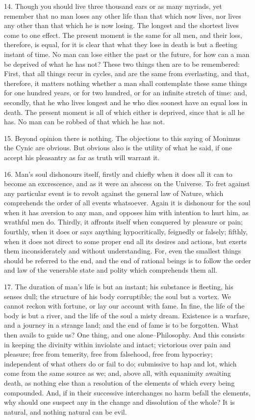 \documentclass{book}
\begin{document}
14. Though you should live three thousand ears or as many myriads, yet
remember that no man loses any other life than that which now lives,
nor lives any other than that which he is now losing. The longest and
the shortest lives come to one effect. The present moment is the same
for all men, and their loss, therefore, is equal, for it is clear that
what they lose in death is but a fleeting instant of time. No man can
lose either the past or the future, for how can a man be deprived of
what he has not? These two things then are to be remembered: First,
that all things recur in cycles, and are the same from everlasting,
and that, therefore, it matters nothing whether a man shall
contemplate these same things for one hundred years, or for two
hundred, or for an infinite stretch of time: and, secondly, that he
who lives longest and he who dies soonest have an equal loss in
death. The present moment is all of which either is deprived, since
that is all he has. No man can be robbed of that which he has not.

15. Beyond opinion there is nothing. The objections to this saying of
Monimus the Cynic are obvious. But obvious also is the utility of what
he said, if one accept his pleasantry as far as truth will warrant it.

16. Man's soul dishonours itself, firstly and chiefly when it does all
it can to become an excrescence, and as it were an abscess on the
Universe. To fret against any particular event is to revolt against
the general law of Nature, which comprehends the order of all events
whatsoever. Again it is dishonour for the soul when it has aversion to
any man, and opposes him with intention to hurt him, as wrathful men
do. Thirdly, it affronts itself when conquered by pleasure or pain;
fourthly, when it does or says anything hypocritically, feignedly or
falsely; fifthly, when it does not direct to some proper end all its
desires and actions, but exerts them inconsiderately and without
understanding. For, even the smallest things should be referred to the
end, and the end of rational beings is to follow the order and law of
the venerable state and polity which comprehends them all.

17. The duration of man's life is but an instant; his substance is
fleeting, his senses dull; the structure of his body corruptible; the
soul but a vortex. We cannot reckon with fortune, or lay our account
with fame. In fine, the life of the body is but a river, and the life
of the soul a misty dream. Existence is a warfare, and a journey in a
strange land; and the end of fame is to be forgotten. What then avails
to guide us? One thing, and one alone--Philosophy. And this consists
in keeping the divinity within inviolate and intact; victorious over
pain and pleasure; free from temerity, free from falsehood, free from
hypocrisy; independent of what others do or fail to do; submissive to
hap and lot, which come from the same source as we; and, above all,
with equanimity awaiting death, as nothing else than a resolution of
the elements of which every being compounded. And, if in their
successive interchanges no harm befall the elements, why should one
suspect any in the change and dissolution of the whole? It is natural,
and nothing natural can be evil.
\end{document}
